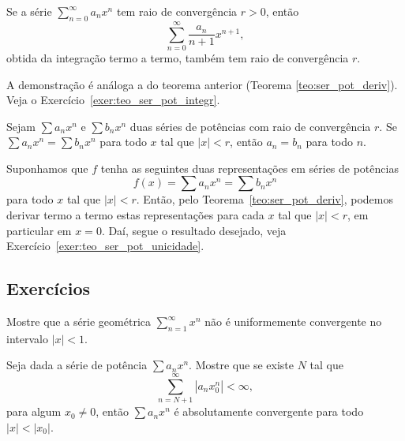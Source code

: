 \begin{teo}\label{teo:ser_pot_integr}
  Se a série $\sum_{n=0}^\infty a_nx^n$ tem raio de convergência $r>0$, então 
  \begin{equation}
    \sum_{n=0}^\infty \frac{a_n}{n+1}x^{n+1},
  \end{equation}
obtida da integração termo a termo, também tem raio de convergência $r$.  
\end{teo}
\begin{dem}
  A demonstração é análoga a do teorema anterior (Teorema \ref{teo:ser_pot_deriv}). Veja o Exercício~\ref{exer:teo_ser_pot_integr}.
\end{dem}

\begin{teo}\label{teo:ser_pot_unicidade}
  Sejam $\sum a_nx^n$ e $\sum b_nx^n$ duas séries de potências com raio de convergência $r$. Se $\sum a_nx^n = \sum b_nx^n$ para todo $x$ tal que $|x|<r$, então $a_n=b_n$ para todo $n$.
\end{teo}
\begin{dem}
  Suponhamos que $f$ tenha as seguintes duas representações em séries de potências
  \begin{equation}
    f(x) = \sum a_nx^n = \sum b_nx^n
  \end{equation}
para todo $x$ tal que $|x|<r$. Então, pelo Teorema~\ref{teo:ser_pot_deriv}, podemos derivar termo a termo estas representações para cada $x$ tal que $|x|<r$, em particular em $x=0$. Daí, segue o resultado desejado, veja Exercício~\ref{exer:teo_ser_pot_unicidade}.
\end{dem}

\subsection*{Exercícios}

\begin{exer}
  Mostre que a série geométrica $\sum_{n=1}^\infty x^n$ não é uniformemente convergente no intervalo $|x|<1$.
\end{exer}

\begin{exer}
  Seja dada a série de potência $\sum a_nx^n$. Mostre que se existe $N$ tal que
  \begin{equation}
    \sum_{n=N+1}^\infty |a_nx_0^n| < \infty,
  \end{equation}
para algum $x_0\neq 0$, então $\sum a_nx^n$ é absolutamente convergente para todo $|x|<|x_0|$.
\end{exer}

